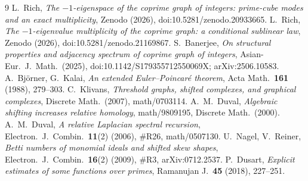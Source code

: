 \documentclass[11pt,reqno]{amsart}
\theoremstyle{plain}
\theoremstyle{definition}
\theoremstyle{plain}
\begin{document}
\begin{thebibliography}{9}
 L.~Rich, \emph{The $-1$-eigenspace of the coprime graph of integers:
prime-cube modes and an exact multiplicity}, Zenodo (2026), doi:10.5281/zenodo.20933665.
 L.~Rich, \emph{The $-1$-eigenvalue multiplicity of the coprime graph:
a conditional sublinear law}, Zenodo (2026), doi:10.5281/zenodo.21169867.
 S.~Banerjee, \emph{On structural properties and adjacency spectrum of
coprime graph of integers}, Asian-Eur.\ J.\ Math.\ (2025), doi:10.1142/S179355712550069X;
arXiv:2506.10583.
 A.~Björner, G.~Kalai, \emph{An extended Euler--Poincaré theorem}, Acta
Math.\ \textbf{161} (1988), 279--303.
 C.~Klivans, \emph{Threshold graphs, shifted complexes, and graphical
complexes}, Discrete Math.\ (2007), math/0703114.
 A.~M.~Duval, \emph{Algebraic shifting increases relative homology},
math/9809195, Discrete Math.\ (2000).
 A.~M.~Duval, \emph{A relative Laplacian spectral recursion}, Electron.\ J.\
Combin.\ \textbf{11}(2) (2006), \#R26, math/0507130.
 U.~Nagel, V.~Reiner, \emph{Betti numbers of monomial ideals and shifted
skew shapes}, Electron.\ J.\ Combin.\ \textbf{16}(2) (2009), \#R3, arXiv:0712.2537.
\bibitem{Dusart} P.~Dusart, \emph{Explicit estimates of some functions over primes}, Ramanujan
J.\ \textbf{45} (2018), 227--251.
\end{thebibliography}
\end{document}
